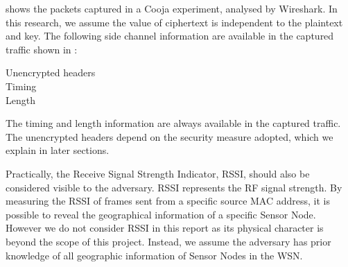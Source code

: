  shows the packets captured in a Cooja experiment, analysed by Wireshark\cite{Wireshark}. In this research, we assume the value of ciphertext is independent to the plaintext and key. The following side channel information are available in the captured traffic shown in :

\begin{description}
	\item[Unencrypted headers]
	\item[Timing]
	\item[Length]
\end{description}

The timing and length information are always available in the captured traffic. The unencrypted headers depend on the security measure adopted, which we explain in later sections.

Practically, the Receive Signal Strength Indicator, RSSI, should also be considered visible to the adversary. RSSI represents the RF signal strength. By measuring the RSSI of frames sent from a specific source MAC address,  it is possible to reveal the geographical information of a specific Sensor Node. However we do not consider RSSI in this report as its physical character is beyond the scope of this project. Instead, we assume the adversary has prior knowledge of all geographic information of Sensor Nodes in the WSN.

